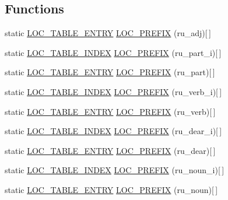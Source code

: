\subsection*{Functions}
\begin{DoxyCompactItemize}
\item 
static \hyperlink{structLOC__TABLE__ENTRY}{L\-O\-C\-\_\-\-T\-A\-B\-L\-E\-\_\-\-E\-N\-T\-R\-Y} \hyperlink{sphinxstemru_8inl_ad8f4f2fc58fe22a03851d4fd490bc419}{L\-O\-C\-\_\-\-P\-R\-E\-F\-I\-X} (ru\-\_\-adj)\mbox{[}$\,$\mbox{]}
\item 
static \hyperlink{structLOC__TABLE__INDEX}{L\-O\-C\-\_\-\-T\-A\-B\-L\-E\-\_\-\-I\-N\-D\-E\-X} \hyperlink{sphinxstemru_8inl_afb51e93f89e9eae061746fd9f39ee13d}{L\-O\-C\-\_\-\-P\-R\-E\-F\-I\-X} (ru\-\_\-part\-\_\-i)\mbox{[}$\,$\mbox{]}
\item 
static \hyperlink{structLOC__TABLE__ENTRY}{L\-O\-C\-\_\-\-T\-A\-B\-L\-E\-\_\-\-E\-N\-T\-R\-Y} \hyperlink{sphinxstemru_8inl_a2b9b173d4feef2d7c98b13d18f18d0c4}{L\-O\-C\-\_\-\-P\-R\-E\-F\-I\-X} (ru\-\_\-part)\mbox{[}$\,$\mbox{]}
\item 
static \hyperlink{structLOC__TABLE__INDEX}{L\-O\-C\-\_\-\-T\-A\-B\-L\-E\-\_\-\-I\-N\-D\-E\-X} \hyperlink{sphinxstemru_8inl_a185fff3dd5d68c06ec6ea7d08c4b09d1}{L\-O\-C\-\_\-\-P\-R\-E\-F\-I\-X} (ru\-\_\-verb\-\_\-i)\mbox{[}$\,$\mbox{]}
\item 
static \hyperlink{structLOC__TABLE__ENTRY}{L\-O\-C\-\_\-\-T\-A\-B\-L\-E\-\_\-\-E\-N\-T\-R\-Y} \hyperlink{sphinxstemru_8inl_ac7034a1d58cb6a43d7b33cbf4b668ee1}{L\-O\-C\-\_\-\-P\-R\-E\-F\-I\-X} (ru\-\_\-verb)\mbox{[}$\,$\mbox{]}
\item 
static \hyperlink{structLOC__TABLE__INDEX}{L\-O\-C\-\_\-\-T\-A\-B\-L\-E\-\_\-\-I\-N\-D\-E\-X} \hyperlink{sphinxstemru_8inl_afcc8e44ce80432eac219a95666e2584e}{L\-O\-C\-\_\-\-P\-R\-E\-F\-I\-X} (ru\-\_\-dear\-\_\-i)\mbox{[}$\,$\mbox{]}
\item 
static \hyperlink{structLOC__TABLE__ENTRY}{L\-O\-C\-\_\-\-T\-A\-B\-L\-E\-\_\-\-E\-N\-T\-R\-Y} \hyperlink{sphinxstemru_8inl_a717dfdabed0079294cf5957590809637}{L\-O\-C\-\_\-\-P\-R\-E\-F\-I\-X} (ru\-\_\-dear)\mbox{[}$\,$\mbox{]}
\item 
static \hyperlink{structLOC__TABLE__INDEX}{L\-O\-C\-\_\-\-T\-A\-B\-L\-E\-\_\-\-I\-N\-D\-E\-X} \hyperlink{sphinxstemru_8inl_acbe46377119793e6f2914f71be7f83ff}{L\-O\-C\-\_\-\-P\-R\-E\-F\-I\-X} (ru\-\_\-noun\-\_\-i)\mbox{[}$\,$\mbox{]}
\item 
static \hyperlink{structLOC__TABLE__ENTRY}{L\-O\-C\-\_\-\-T\-A\-B\-L\-E\-\_\-\-E\-N\-T\-R\-Y} \hyperlink{sphinxstemru_8inl_a239cc7b2d29b4af3b38b5c1871a09587}{L\-O\-C\-\_\-\-P\-R\-E\-F\-I\-X} (ru\-\_\-noun)\mbox{[}$\,$\mbox{]}

\end{DoxyCompactItemize}
